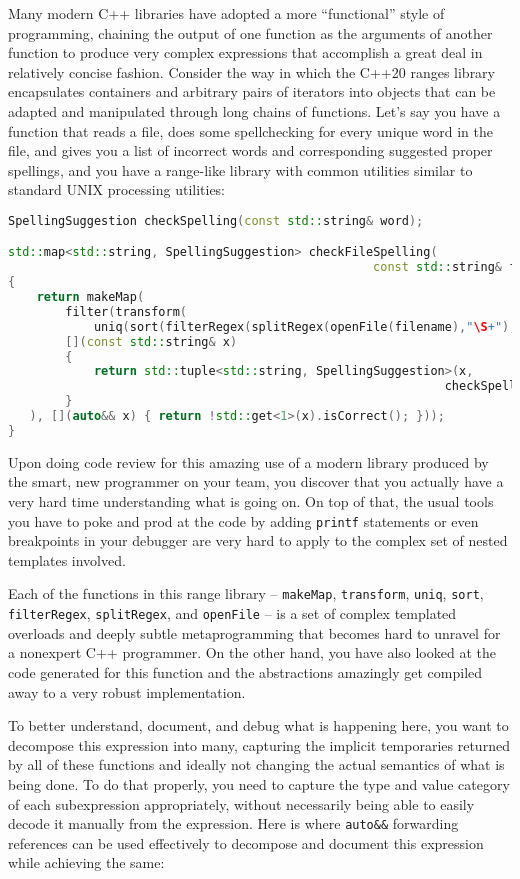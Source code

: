 Many modern C++ libraries have adopted a more ``functional'' style of
programming, chaining the output of one function as the arguments of
another function to produce very complex expressions that accomplish a
great deal in relatively concise fashion. Consider the way in which the
C++20 ranges library encapsulates containers and arbitrary pairs of
iterators into objects that can be adapted and manipulated through long
chains of functions. Let's say you have a function that reads a file,
does some spellchecking for every unique word in the file, and gives you a
list of incorrect words and corresponding suggested proper spellings,
and you have a range-like library with common utilities similar to
standard UNIX processing utilities:

\begin{lstlisting}[language=C++]
SpellingSuggestion checkSpelling(const std::string& word);

std::map<std::string, SpellingSuggestion> checkFileSpelling(
                                                   const std::string& filename)
{
    return makeMap(
        filter(transform(
            uniq(sort(filterRegex(splitRegex(openFile(filename),"\S+"),"\w+")))
        [](const std::string& x)
        {
            return std::tuple<std::string, SpellingSuggestion>(x,
                                                             checkSpelling(x));
        }
   ), [](auto&& x) { return !std::get<1>(x).isCorrect(); }));
}
\end{lstlisting}

\noindent Upon doing code review for this amazing use of a modern library produced
by the smart, new programmer on your team, you discover that you actually
have a very hard time understanding what is going on. On top of that,
the usual tools you have to poke and prod at the code by adding
\texttt{printf} statements or even breakpoints in your debugger are very
hard to apply to the complex set of nested templates involved.

Each of the functions in this range library -- \texttt{makeMap},
\texttt{transform}, \texttt{uniq}, \texttt{sort}, \texttt{filterRegex},
\texttt{splitRegex}, and \texttt{openFile} -- is a set of complex
templated overloads and deeply subtle metaprogramming that becomes hard
to unravel for a nonexpert C++ programmer. On the other hand, you have
also looked at the code generated for this function and the abstractions
amazingly get compiled away to a very robust implementation.

To better understand, document, and debug what is happening
here, you want to decompose this expression into many, capturing the
implicit temporaries returned by all of these functions and ideally not
changing the actual semantics of what is being done. To do that
properly, you need to capture the type and value category of each
subexpression appropriately, without necessarily being able to easily
decode it manually from the expression. Here is where \texttt{auto\&\&}
forwarding references can be used effectively to decompose and document
this expression while achieving the same:

